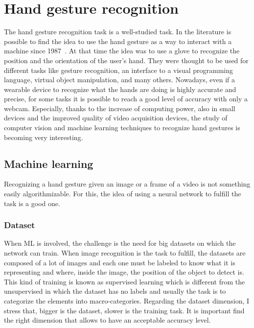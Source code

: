 \documentclass[../thesis.tex]{subfiles}
\begin{document}
\section{Hand gesture recognition}
The hand gesture recognition task is a well-studied task. In the literature is possible to find the idea to use the hand gesture as a way to interact with a machine since 1987~\cite{article:hand_gesture_interface_device}. At that time the idea was to use a glove to recognize the position and the orientation of the user's hand. They were thought to be used for different tasks like gesture recognition, an interface to a visual programming language, virtual object manipulation, and many others. Nowadays, even if a wearable device to recognize what the hands are doing is highly accurate and precise, for some tasks it is possible to reach a good level of accuracy with only a webcam. Especially, thanks to the increase of computing power, also in small devices and the improved quality of video acquisition devices, the study of computer vision and machine learning techniques to recognize hand gestures is becoming very interesting.

\subsection{Machine learning}
Recognizing a hand gesture given an image or a frame of a video is not something easily algorithmizable. For this, the idea of using a neural network to fulfill the task is a good one.

\subsubsection{Dataset}
When \acrshort{ML} is involved, the challenge is the need for big datasets on which the network can train. When image recognition is the task to fulfill, the datasets are composed of a lot of images and each one must be labeled to know what it is representing and where, inside the image, the position of the object to detect is. This kind of training is known as supervised learning which is different from the unsupervised in which the dataset has no labels and usually the task is to categorize the elements into macro-categories. Regarding the dataset dimension, I stress that, bigger is the dataset, slower is the training task. It is important find the right dimension that allows to have an acceptable accuracy level.
\end{document}
